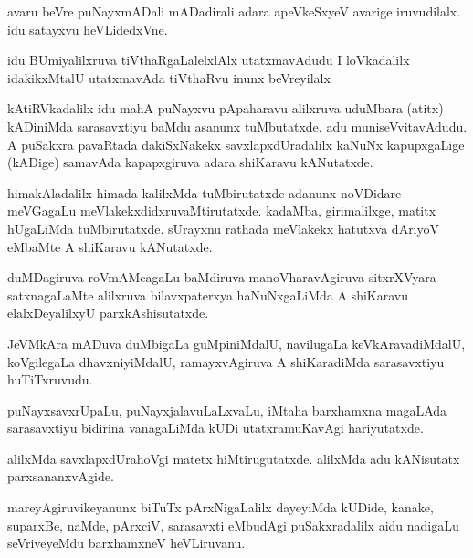 \begin{mng}
avaru beVre puNayxmADali mADadirali adara apeVkeSxyeV avarige iruvudilalx. idu satayxvu heVLidedxVne.
\end{mng}

\begin{mng}
idu BUmiyalilxruva tiVthaRgaLalelxlAlx utatxmavAdudu I loVkadalilx idakikxMtalU utatxmavAda tiVthaRvu inunx beVreyilalx
\end{mng}

\begin{mng}
kAtiRVkadalilx idu mahA puNayxvu pApaharavu alilxruva uduMbara (atitx) kADiniMda sarasavxtiyu baMdu asanunx tuMbutatxde. adu muniseVvitavAdudu. A puSakxra pavaRtada dakiSxNakekx savxlapxdUradalilx kaNuNx kapupxgaLige (kADige) samavAda kapapxgiruva adara shiKaravu kANutatxde.
\end{mng}

\begin{mng}
himakAladalilx himada kalilxMda tuMbirutatxde adanunx noVDidare meVGagaLu meVlakekxdidxruvaMtirutatxde. kadaMba, girimalilxge, matitx hUgaLiMda tuMbirutatxde. sUrayxnu rathada meVlakekx hatutxva dAriyoV eMbaMte A shiKaravu kANutatxde.
\end{mng}

\begin{mng}
duMDagiruva roVmAMcagaLu baMdiruva manoVharavAgiruva sitxrXVyara satxnagaLaMte alilxruva bilavxpaterxya haNuNxgaLiMda A shiKaravu elalxDeyalilxyU parxkAshisutatxde.
\end{mng}

\begin{mng}
JeVMkAra mADuva duMbigaLa guMpiniMdalU, navilugaLa keVkAravadiMdalU, koVgilegaLa dhavxniyiMdalU, ramayxvAgiruva A shiKaradiMda sarasavxtiyu huTiTxruvudu.
\end{mng}

\begin{mng}
puNayxsavxrUpaLu, puNayxjalavuLaLxvaLu, iMtaha barxhamxna magaLAda sarasavxtiyu bidirina vanagaLiMda kUDi utatxramuKavAgi hariyutatxde.
\end{mng}

\begin{mng}
alilxMda savxlapxdUrahoVgi matetx hiMtirugutatxde. alilxMda adu kANisutatx parxsananxvAgide.
\end{mng}

\begin{mng}
mareyAgiruvikeyanunx biTuTx pArxNigaLalilx dayeyiMda kUDide, kanake, suparxBe, naMde, pArxciV, sarasavxti eMbudAgi puSakxradalilx aidu nadigaLu seVriveyeMdu barxhamxneV heVLiruvanu.
\end{mng}

